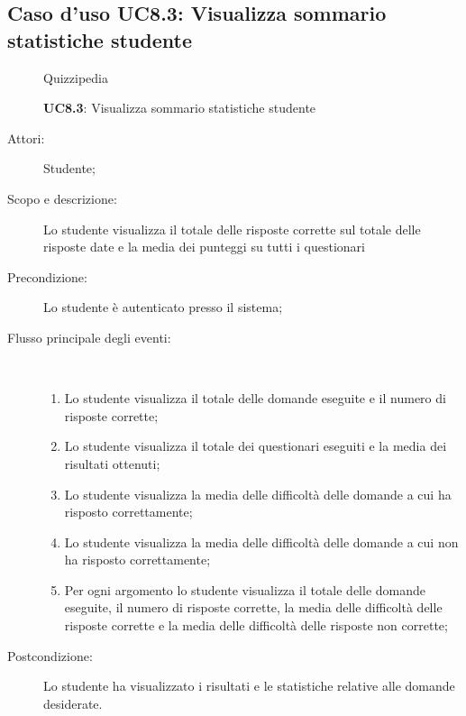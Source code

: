 \subsection{Caso d'uso UC8.3: Visualizza sommario statistiche studente}
	\begin{figure}[H]
		\centering
		\begin{resizedtikzpicture}{\textwidth}
		\begin{umlsystem}[x=0, fill=lightgray!20]{Quizzipedia}
		\end{umlsystem}
		\end{resizedtikzpicture}
		\caption{\textbf{UC8.3}: Visualizza sommario statistiche studente}
		\label{UC8.3}
	\end{figure}
\begin{description}
\item[Attori:] Studente;
\item[Scopo e descrizione:] Lo studente visualizza il totale delle risposte corrette sul totale delle risposte date e la media dei punteggi su tutti i questionari
      \item[Precondizione:] Lo studente è autenticato presso il sistema;

        \item[Flusso principale degli eventi:] \ 
 \begin{enumerate}
          \item Lo studente visualizza il totale delle domande eseguite e il numero di risposte corrette;
          \item Lo studente visualizza il totale dei questionari eseguiti e la media dei risultati ottenuti;
          \item Lo studente visualizza la media delle difficoltà delle domande a cui ha risposto correttamente;
          \item Lo studente visualizza la media delle difficoltà delle domande a cui non ha risposto correttamente;
          \item Per ogni argomento lo studente visualizza il totale delle domande eseguite, il numero di risposte corrette, la media delle difficoltà delle risposte corrette e la media delle difficoltà delle risposte non corrette;

      \end{enumerate}
    \item[Postcondizione:] Lo studente ha visualizzato i risultati e le statistiche relative alle domande desiderate.
  \end{description}
\hypertarget{UC9}{}
